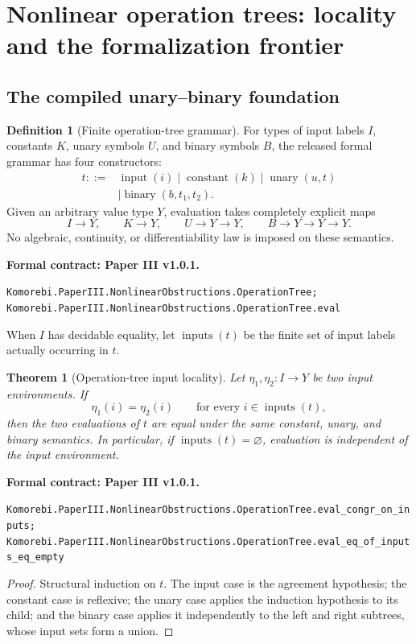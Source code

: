 \documentclass[11pt,a4paper]{article}
\newtheorem{theorem}{Theorem}[section]
\theoremstyle{plain}
\theoremstyle{definition}
\newtheorem{definition}[definition]{Definition}
\theoremstyle{remark}
\newcommand{\leanname}[1]{\nolinkurl{#1}}
\newcommand{\statusleanthree}[1]{\par\smallskip\noindent\begin{minipage}{\linewidth}{\color{leanblue}\textbf{Formal contract: Paper III v1.0.1.}}\par\begingroup\small\raggedright\leanname{#1}\par\endgroup\end{minipage}\par\smallskip}
\begin{document}
\clearpage\section{Nonlinear operation trees: locality and the formalization frontier}
\label{sec:operation-trees}

\subsection{The compiled unary--binary foundation}

\begin{definition}[Finite operation-tree grammar]
\label{def:compiled-operation-tree}
For types of input labels $I$, constants $K$, unary symbols $U$, and binary
symbols $B$, the released formal grammar has four constructors:
\[
\begin{aligned}
t ::={}&\operatorname{input}(i)
\mid\operatorname{constant}(k)
\mid\operatorname{unary}(u,t)\\
&\mid\operatorname{binary}(b,t_1,t_2).
\end{aligned}
\]
Given an arbitrary value type $Y$, evaluation takes completely explicit maps
\[
I\to Y,\qquad K\to Y,\qquad U\to Y\to Y,\qquad
B\to Y\to Y\to Y.
\]
No algebraic, continuity, or differentiability law is imposed on these
semantics.
\end{definition}
\statusleanthree{Komorebi.PaperIII.NonlinearObstructions.OperationTree; Komorebi.PaperIII.NonlinearObstructions.OperationTree.eval}

When $I$ has decidable equality, let $\operatorname{inputs}(t)$ be the finite
set of input labels actually occurring in $t$.

\begin{theorem}[Operation-tree input locality]
\label{thm:tree-locality}
Let $\eta_1,\eta_2:I\to Y$ be two input environments.  If
\[
\eta_1(i)=\eta_2(i)
\qquad\text{for every }i\in\operatorname{inputs}(t),
\]
then the two evaluations of $t$ are equal under the same constant, unary, and
binary semantics.  In particular, if
$\operatorname{inputs}(t)=\varnothing$, evaluation is independent of the
input environment.
\end{theorem}
\statusleanthree{Komorebi.PaperIII.NonlinearObstructions.OperationTree.eval_congr_on_inputs; Komorebi.PaperIII.NonlinearObstructions.OperationTree.eval_eq_of_inputs_eq_empty}

\begin{proof}
Structural induction on $t$.  The input case is the agreement hypothesis;
the constant case is reflexive; the unary case applies the induction
hypothesis to its child; and the binary case applies it independently to the
left and right subtrees, whose input sets form a union.
\end{proof}
\end{document}
